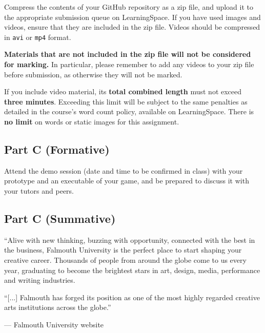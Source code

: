 \documentclass{../fal_assignment}
\begin{document}
Compress the contents of your GitHub repository as a zip file,
and upload it to the appropriate submission queue on LearningSpace.
If you have used images and videos, ensure that they are included in the zip file.
Videos should be compressed in \texttt{avi} or \texttt{mp4} format.

\textbf{Materials that are not included in the zip file will not be considered for marking.}
In particular, please remember to add any videos to your zip file before submission,
as otherwise they will not be marked.

If you include video material, its \textbf{total combined length} must not exceed \textbf{three minutes}.
Exceeding this limit will be subject to the same penalties as detailed in the course's word count policy,
available on LearningSpace.
There is \textbf{no limit} on words or static images for this assignment.

\subsection*{Part C (Formative)}

Attend the demo session (date and time to be confirmed in class)
with your prototype and an executable of your game,
and be prepared to discuss it with your tutors and peers.

\subsection*{Part C (Summative)}




\begin{marginquote}
    ``Alive with new thinking, buzzing with opportunity, connected with the best in the business,
    Falmouth University is the perfect place to start shaping your creative career.
    Thousands of people from around the globe come to us every year,
    graduating to become the brightest stars in art, design, media, performance and writing industries.

    ``[...]
    Falmouth has forged its position as one of the most highly regarded creative arts institutions across the globe.''
    
    --- Falmouth University website
\end{marginquote}
\end{document}
